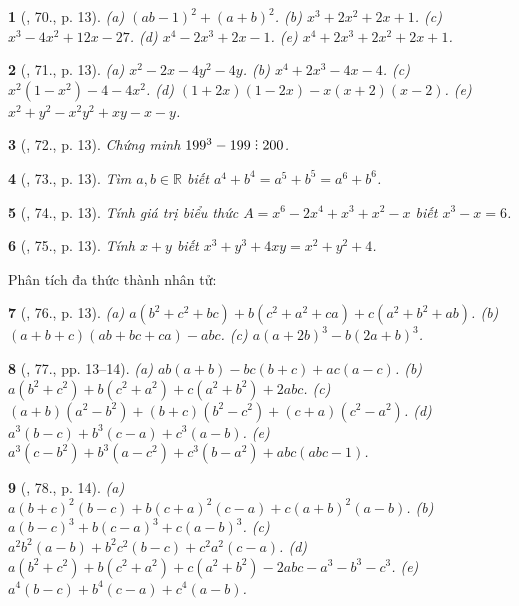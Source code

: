\documentclass{article}
\newtheorem{baitoan}{}
\DeclareRobustCommand{\divby}{%
	\mathrel{\vbox{\baselineskip.65ex\lineskiplimit0pt\hbox{.}\hbox{.}\hbox{.}}}%
}
\begin{document}
\begin{baitoan}[\cite{Binh_Toan_8_tap_1}, 70., p. 13]
	(a) $(ab - 1)^2 + (a + b)^2$. (b) $x^3 + 2x^2 + 2x + 1$. (c) $x^3 - 4x^2 + 12x - 27$. (d) $x^4 - 2x^3 + 2x - 1$. (e) $x^4 + 2x^3 + 2x^2 + 2x + 1$.
\end{baitoan}

\begin{baitoan}[\cite{Binh_Toan_8_tap_1}, 71., p. 13]
	(a) $x^2 - 2x - 4y^2 - 4y$. (b) $x^4 + 2x^3 - 4x - 4$. (c) $x^2(1 - x^2) - 4 - 4x^2$. (d) $(1 + 2x)(1 - 2x) - x(x + 2)(x - 2)$. (e) $x^2 + y^2 - x^2y^2 + xy - x - y$.
\end{baitoan}

\begin{baitoan}[\cite{Binh_Toan_8_tap_1}, 72., p. 13]
	Chứng minh $199^3 - 199\divby200$.
\end{baitoan}

\begin{baitoan}[\cite{Binh_Toan_8_tap_1}, 73., p. 13]
	Tìm $a,b\in\mathbb{R}$ biết $a^4 + b^4 = a^5 + b^5 = a^6 + b^6$.
\end{baitoan}

\begin{baitoan}[\cite{Binh_Toan_8_tap_1}, 74., p. 13]
	Tính giá trị biểu thức $A = x^6 - 2x^4 + x^3 + x^2 - x$ biết $x^3 - x = 6$.
\end{baitoan}

\begin{baitoan}[\cite{Binh_Toan_8_tap_1}, 75., p. 13]
	Tính $x + y$ biết $x^3 + y^3 + 4xy = x^2 + y^2 + 4$.
\end{baitoan}
Phân tích đa thức thành nhân tử:

\begin{baitoan}[\cite{Binh_Toan_8_tap_1}, 76., p. 13]
	(a) $a(b^2 + c^2 + bc) + b(c^2 + a^2 + ca) + c(a^2 + b^2 + ab)$. (b) $(a + b + c)(ab + bc + ca) - abc$. (c) $a(a + 2b)^3 - b(2a + b)^3$.
\end{baitoan}

\begin{baitoan}[\cite{Binh_Toan_8_tap_1}, 77., pp. 13--14]
	(a) $ab(a + b) - bc(b + c) + ac(a - c)$. (b) $a(b^2 + c^2) + b(c^2 + a^2) + c(a^2 + b^2) + 2abc$. (c) $(a + b)(a^2 - b^2) + (b + c)(b^2 - c^2) + (c + a)(c^2 - a^2)$. (d) $a^3(b - c) + b^3(c - a) + c^3(a - b)$. (e) $a^3(c - b^2) + b^3(a - c^2) + c^3(b - a^2) + abc(abc - 1)$.
\end{baitoan}

\begin{baitoan}[\cite{Binh_Toan_8_tap_1}, 78., p. 14]
	(a) $a(b + c)^2(b - c) + b(c + a)^2(c - a) + c(a + b)^2(a - b)$. (b) $a(b - c)^3 + b(c - a)^3 + c(a - b)^3$. (c) $a^2b^2(a - b) + b^2c^2(b - c) + c^2a^2(c - a)$. (d) $a(b^2 + c^2) + b(c^2 + a^2) + c(a^2 + b^2) - 2abc - a^3 - b^3 - c^3$. (e) $a^4(b - c) + b^4(c - a) + c^4(a - b)$.
\end{baitoan}
\end{document}
